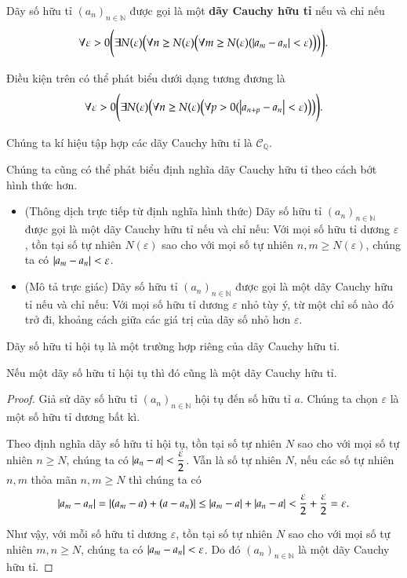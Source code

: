 \begin{definition}
    Dãy số hữu tỉ ${(a_{n})}_{n\in\mathbb{N}}$ được gọi là một \textbf{dãy Cauchy hữu tỉ} nếu và chỉ nếu
    \[
        \forall\varepsilon > 0 \Biggl( \exists N(\varepsilon) \Bigl( \forall n\geq N(\varepsilon) \bigl(\forall m\geq N(\varepsilon) (\left\vert{a_{m} - a_{n}}\right\vert < \varepsilon)\bigr) \Bigr) \Biggr).
    \]

    \noindent Điều kiện trên có thể phát biểu dưới dạng tương đương là
    \[
        \forall\varepsilon > 0 \Biggl( \exists N(\varepsilon) \Bigl( \forall n\geq N(\varepsilon) \bigl(\forall p > 0 (\left\vert{a_{n+p} - a_{n}}\right\vert < \varepsilon)\bigr) \Bigr) \Biggr).
    \]

    \noindent Chúng ta kí hiệu tập hợp các dãy Cauchy hữu tỉ là $\mathscr{C}_{\mathbb{Q}}$.
\end{definition}

Chúng ta cũng có thể phát biểu định nghĩa dãy Cauchy hữu tỉ theo cách bớt hình thức hơn.
\begin{itemize}
    \item (Thông dịch trực tiếp từ định nghĩa hình thức) Dãy số hữu tỉ ${(a_{n})}_{n\in\mathbb{N}}$ được gọi là một dãy Cauchy hữu tỉ nếu và chỉ nếu: Với mọi số hữu tỉ dương $\varepsilon$, tồn tại số tự nhiên $N(\varepsilon)$ sao cho với mọi số tự nhiên $n, m\geq N(\varepsilon)$, chúng ta có $\left\vert{a_{m} - a_{n}}\right\vert < \varepsilon$.
    \item (Mô tả trực giác) Dãy số hữu tỉ ${(a_{n})}_{n\in\mathbb{N}}$ được gọi là một dãy Cauchy hữu tỉ nếu và chỉ nếu: Với mọi số hữu tỉ dương $\varepsilon$ nhỏ tùy ý, từ một chỉ số nào đó trở đi, khoảng cách giữa các giá trị của dãy số nhỏ hơn $\varepsilon$.
\end{itemize}

Dãy số hữu tỉ hội tụ là một trường hợp riêng của dãy Cauchy hữu tỉ.
\begin{appendixthm}
    Nếu một dãy số hữu tỉ hội tụ thì đó cũng là một dãy Cauchy hữu tỉ.
\end{appendixthm}

\begin{proof}
    Giả sử dãy số hữu tỉ ${(a_{n})}_{n\in\mathbb{N}}$ hội tụ đến số hữu tỉ $a$. Chúng ta chọn $\varepsilon$ là một số hữu tỉ dương bất kì.

    Theo định nghĩa dãy số hữu tỉ hội tụ, tồn tại số tự nhiên $N$ sao cho với mọi số tự nhiên $n\geq N$, chúng ta có $\left\vert{a_{n} - a}\right\vert < \dfrac{\varepsilon}{2}$. Vẫn là số tự nhiên $N$, nếu các số tự nhiên $n, m$ thỏa mãn $n, m\geq N$ thì chúng ta có
    \[
        \left\vert{a_{m} - a_{n}}\right\vert = \left\vert{(a_{m} - a) + (a - a_{n})}\right\vert \leq \left\vert{a_{m} - a}\right\vert + \left\vert{a_{n} - a}\right\vert < \frac{\varepsilon}{2} + \frac{\varepsilon}{2} = \varepsilon.
    \]

    Như vậy, với mỗi số hữu tỉ dương $\varepsilon$, tồn tại số tự nhiên $N$ sao cho với mọi số tự nhiên $m, n\geq N$, chúng ta có $\left\vert{a_{m} - a_{n}}\right\vert < \varepsilon$. Do đó ${(a_{n})}_{n\in\mathbb{N}}$ là một dãy Cauchy hữu tỉ.
\end{proof}

